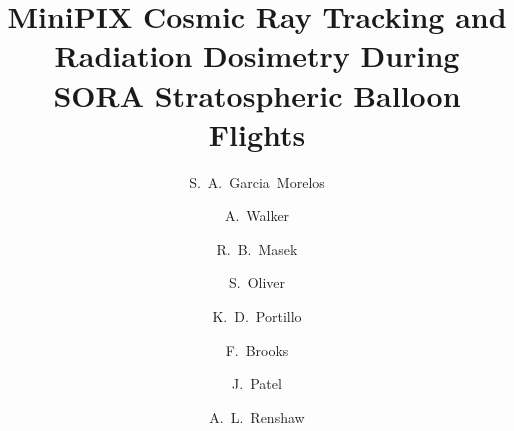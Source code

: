 \documentclass[preprint,review,12pt]{elsarticle}
\begin{document}
\begin{frontmatter}


\title{MiniPIX Cosmic Ray Tracking and Radiation Dosimetry During SORA Stratospheric Balloon Flights}


\author{S.~A.~Garcia~Morelos}%
\author{A.~Walker}%
\author{R.~B.~Masek}
\author{S.~Oliver}
\author{K.~D.~Portillo}
\author{F.~Brooks}
\author{J.~Patel}
\author{A.~L.~Renshaw}



\address[label2,label3,label4,label5,label6,label7,label8,label9,label10,label11]{Department of Physics, University of Houston, Houston, TX 77204, USA}



\end{frontmatter}
\end{document}
